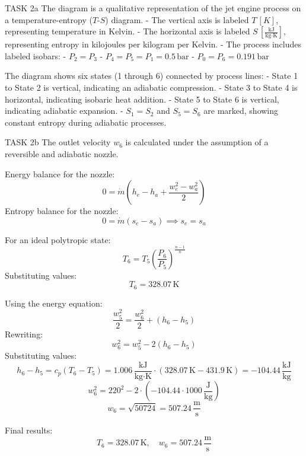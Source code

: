 TASK 2a  
The diagram is a qualitative representation of the jet engine process on a temperature-entropy (\( T \)-\( S \)) diagram.  
- The vertical axis is labeled \( T \, [K] \), representing temperature in Kelvin.  
- The horizontal axis is labeled \( S \, [\frac{\text{kJ}}{\text{kg·K}}] \), representing entropy in kilojoules per kilogram per Kelvin.  
- The process includes labeled isobars:  
  - \( P_2 = P_3 \)  
  - \( P_4 = P_5 = P_1 = 0.5 \, \text{bar} \)  
  - \( P_0 = P_6 = 0.191 \, \text{bar} \)  

The diagram shows six states (1 through 6) connected by process lines:  
- State 1 to State 2 is vertical, indicating an adiabatic compression.  
- State 3 to State 4 is horizontal, indicating isobaric heat addition.  
- State 5 to State 6 is vertical, indicating adiabatic expansion.  
- \( S_1 = S_2 \) and \( S_5 = S_6 \) are marked, showing constant entropy during adiabatic processes.  

TASK 2b  
The outlet velocity \( w_6 \) is calculated under the assumption of a reversible and adiabatic nozzle.  

Energy balance for the nozzle:  
\[
0 = \dot{m} \left( h_e - h_a + \frac{w_e^2 - w_a^2}{2} \right)
\]  
Entropy balance for the nozzle:  
\[
0 = \dot{m} \left( s_e - s_a \right) \implies s_e = s_a
\]  

For an ideal polytropic state:  
\[
T_6 = T_5 \left( \frac{P_6}{P_5} \right)^{\frac{n-1}{n}}
\]  
Substituting values:  
\[
T_6 = 328.07 \, \text{K}
\]  

Using the energy equation:  
\[
\frac{w_5^2}{2} = \frac{w_6^2}{2} + (h_6 - h_5)
\]  
Rewriting:  
\[
w_6^2 = w_5^2 - 2(h_6 - h_5)
\]  
Substituting values:  
\[
h_6 - h_5 = c_p (T_6 - T_5) = 1.006 \, \frac{\text{kJ}}{\text{kg·K}} \cdot (328.07 \, \text{K} - 431.9 \, \text{K}) = -104.44 \, \frac{\text{kJ}}{\text{kg}}
\]  
\[
w_6^2 = 220^2 - 2 \cdot (-104.44 \cdot 1000 \, \frac{\text{J}}{\text{kg}})
\]  
\[
w_6 = \sqrt{50724} = 507.24 \, \frac{\text{m}}{\text{s}}
\]  

Final results:  
\[
T_6 = 328.07 \, \text{K}, \quad w_6 = 507.24 \, \frac{\text{m}}{\text{s}}
\]